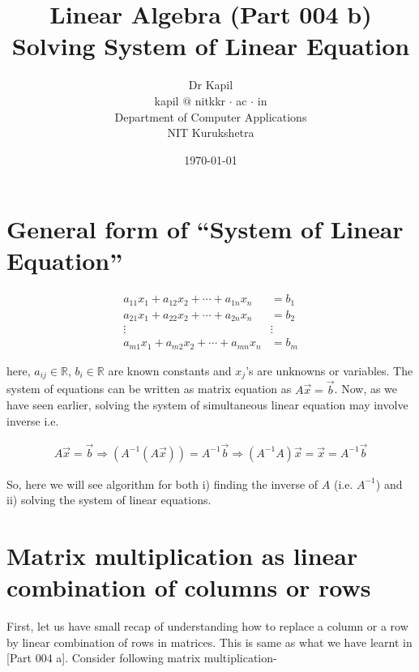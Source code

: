 \documentclass{article}
\title{Linear Algebra (Part 004 b)\\Solving System of Linear Equation}
\author{Dr Kapil\\kapil $@$ nitkkr $\cdot$ ac $\cdot$ in\\Department of Computer Applications\\ NIT Kurukshetra}
\date{\today}
\begin{document}
    \maketitle
    \thispagestyle{fancy}

\section{General form of ``System of Linear Equation''}
\begin{align}
    a_{11}x_1 + a_{12}x_2 + \cdots + a_{1n}x_n &= b_1 \nonumber\\
    a_{21}x_1 + a_{22}x_2 + \cdots + a_{2n}x_n &= b_2 \nonumber\\
    \vdots     ~~~~~~~~~~~~~~~~~~~~~~          & \vdots\nonumber\\
    a_{m1}x_1 + a_{m2}x_2 + \cdots + a_{mn}x_n &= b_m \nonumber
\end{align}

here, $a_{ij} \in \mathbb{R}$, $b_{i} \in \mathbb{R}$ are known constants and $x_j$'s are unknowns or variables. The system of equations can be written as matrix equation as $A\vec{x}=\vec{b}$. Now, as we have seen earlier, solving the system of simultaneous linear equation may involve inverse i.e.

\begin{align}
    A\vec{x} = \vec{b} \Rightarrow (A^{-1}(A\vec{x})) = A^{-1}\vec{b} \Rightarrow (A^{-1}A)\vec{x}  = \vec{x} = A^{-1}\vec{b} \nonumber
\end{align}

So, here we will see algorithm for both i) finding the inverse of $A$ (i.e. $A^{-1}$) and ii) solving the system of linear equations. 



\section{Matrix multiplication as linear combination of columns or rows}    
First, let us have small recap of understanding how to replace a column or a row by linear combination of rows in matrices. This is same as what we have learnt in [Part 004 a]. Consider following matrix multiplication-
\end{document}
